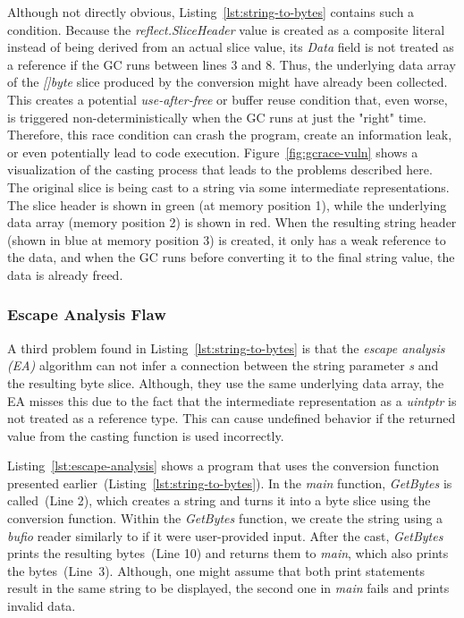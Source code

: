 Although not directly obvious, Listing~\ref{lst:string-to-bytes} contains such a condition.
Because the \textit{reflect.SliceHeader} value is created as a composite literal instead of being derived from an actual slice value, its \textit{Data} field is not treated as a reference if the GC runs between lines 3 and 8. 
Thus, the underlying data array of the \textit{[]byte} slice produced by the conversion might have already been collected.
This creates a potential \textit{use-after-free} or buffer reuse condition that, even worse, is triggered non-deterministically when the GC runs at just the "right" time.
Therefore, this race condition can crash the program, create an information leak, or even potentially lead to code execution.
Figure~\ref{fig:gcrace-vuln} shows a visualization of the casting process that leads to the problems described here.
The original slice is being cast to a string via some intermediate representations.
The slice header is shown in green (at memory position 1), while the underlying data array (memory position 2) is shown in red.
When the resulting string header (shown in blue at memory position 3) is created, it only has a weak reference to the data, and when the GC runs before converting it to the final string value, the data is already freed.




\subsubsection*{Escape Analysis Flaw}

A third problem found in Listing~\ref{lst:string-to-bytes} is that the \textit{escape analysis (EA)} algorithm can not infer a connection between the string parameter \textit{s} and the resulting byte slice.
Although, they use the same underlying data array, the EA misses this due to the fact that the intermediate representation as a \textit{uintptr} is not treated as a reference type.
This can cause undefined behavior if the returned value from the casting function is used incorrectly.

Listing~\ref{lst:escape-analysis} shows a program that uses the conversion function presented earlier~(Listing~\ref{lst:string-to-bytes}).
In the \textit{main} function, \textit{GetBytes} is called~(Line 2), which creates a string and turns it into a byte slice using the conversion function.
Within the \textit{GetBytes} function, we create the string using a \textit{bufio} reader similarly to if it were user-provided input.
After the cast, \textit{GetBytes} prints the resulting bytes~(Line 10) and returns them to \textit{main}, which also prints the bytes~(Line~3).
Although, one might assume that both print statements result in the same string to be displayed, the second one in \textit{main} fails and prints invalid data.


